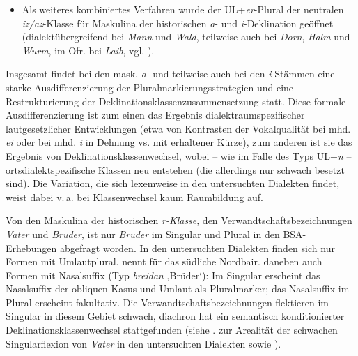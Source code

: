 \begin{itemize}
\item Als weiteres kombiniertes Verfahren wurde der UL+\textit{er}{}-Plural der neutralen \textit{iz/az}{}-Klasse für Maskulina der historischen \textit{a}{}- und \textit{i}{}-Deklination geöffnet (dialektübergreifend bei \textit{Mann} und \textit{Wald}, teilweise auch bei \textit{Dorn}, \textit{Halm} und \textit{Wurm}, im Ofr. bei \textit{Laib}, vgl. \citealt[§797]{Schmeller1821}).
\end{itemize}

Insgesamt findet bei den mask. \textit{a}{}- und teilweise auch bei den \textit{i}{}-Stämmen eine starke Ausdifferenzierung der Pluralmarkierungsstrategien und eine Restrukturierung der Deklinationsklassenzusammensetzung statt. Diese formale Ausdifferenzierung ist zum einen das Ergebnis dialektraumspezifischer lautgesetzlicher Entwicklungen (etwa von Kontrasten der Vokalqualität bei mhd. \textit{ei} oder bei mhd. \textit{i} in Dehnung vs. mit erhaltener Kürze), zum anderen ist sie das Ergebnis von Deklinationsklassenwechsel, wobei -- wie im Falle des Typs UL+\textit{n} -- ortsdialektspezifische Klassen neu entstehen (die allerdings nur schwach besetzt sind). Die Variation, die sich lexemweise in den untersuchten Dialekten findet, weist dabei v.\,a. bei Klassenwechsel kaum Raumbildung auf.

Von den Maskulina der historischen {\textit{r}}\textit{{}-Klasse}, den Verwandtschaftsbezeichnungen \textit{Vater} und \textit{Bruder}, ist nur \textit{Bruder} im Singular und Plural in den BSA-Erhebungen abgefragt worden. In den untersuchten Dialekten finden sich nur Formen mit Umlautplural. \citet[137]{Rowley1997} nennt für das südliche Nordbair. daneben auch Formen mit Nasalsuffix (Typ \textit{breidan} ‚Brüder‘): Im Singular erscheint das Nasalsuffix der obliquen Kasus und Umlaut als Pluralmarker; das Nasalsuffix im Plural erscheint fakultativ. Die Verwandtschaftsbezeichnungen flektieren im Singular in diesem Gebiet schwach, diachron hat ein semantisch konditionierter Deklinationsklassenwechsel stattgefunden (siehe . zur Arealität der schwachen Singularflexion von \textit{Vater} in den untersuchten Dialekten sowie ).


